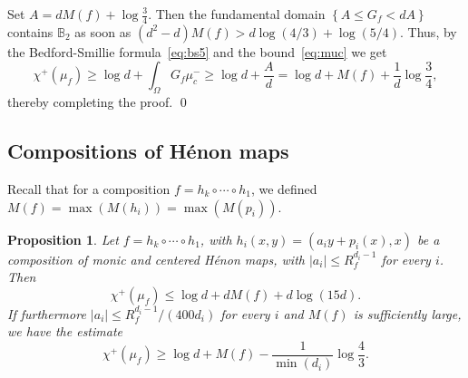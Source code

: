 \documentclass[oneside, 12pt]{amsart}
\newcommand{\set}[1]{\left\{#1\right\}}
\newcommand{\abs}[1]{\left\vert#1\right\vert}
\newcommand{\unsur}[1]{\frac{1}{#1}}
\newcommand{\lrpar}[1]{\left(#1\right)}
\newcommand{\bb}{\mathbb{B}}
\theoremstyle{plain}
\newtheorem{pro}[thm]{Proposition}
\theoremstyle{definition}
\newtheorem{rem}[thm]{Remark}
\numberwithin{equation}{section}       %
\numberwithin{equation}{section}       %
\begin{document}
  
  
  Set $A = dM(f)+ \log\frac34$. 
  Then   the fundamental domain $\set{A\leq G_f< dA}$ contains $\bb_2$ as soon as  $(d^2-d)M(f)> d\log(4/3)+\log (5/4)$.
  Thus, by the Bedford-Smillie 
 formula~\eqref{eq:bs5} and the bound~\eqref{eq:muc}
we get 
\begin{equation} \label{eq:lower_lyap}
\chi^+(\mu_f)\geq   \log d + \int_{\Omega} G_f\mu_c^- \geq \log d+ \frac{A}{d} %
 = \log d +M(f) + \unsur{d} \log\frac34,
\end{equation}
thereby completing the proof.  
\qed
 

\subsection{Compositions of Hénon maps}\label{subs:lyapunov_multi}
Recall that for a composition $f = h_k\circ \cdots \circ h_1$, we defined 
$M(f) = \max (M(h_i)) = \max (M(p_i))$. 

\begin{pro}\label{pro:lyapunov_multi} 
Let $f = h_k\circ \cdots \circ h_1$, with $h_i(x,y) = (a_i y+ p_i(x), x)$ be a composition of 
monic and centered Hénon maps,  with  $\abs{a_i}\leq  R_f^{d_i-1}$ for every $i$. Then  
\begin{equation}
\chi^+(\mu_f) \leq \log d+   dM(f) + d \log (15d).
\end{equation}
If furthermore
$\abs{a_i}\leq  R_f^{d_i-1}/(400 d_i)$ for every $i$  and 
 $M(f)$ is sufficiently large, we have the estimate
\begin{equation}\label{eq:lyapunov_multi}
   \chi^+(\mu_f) \geq \log d +   M(f) -  \unsur{\min(d_i)}\log \frac43 .
\end{equation}
\end{pro}
\end{document}
